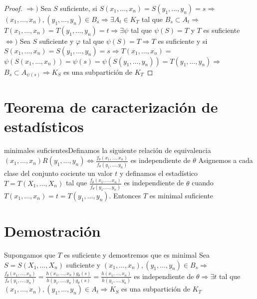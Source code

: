   \begin{proof}
    $\Rightarrow)$ Sea $S$ suficiente, si $S\left(x_{1}, \ldots, x_{n}\right)=S\left(y_{1}, \ldots, y_{n}\right)=s \Rightarrow$ $\left(x_{1}, \ldots, x_{n}\right),\left(y_{1}, \ldots, y_{n}\right) \in B_{s} \Rightarrow \exists A_{t} \in K_{T}$ tal que $B_{s} \subset A_{t} \Rightarrow$ $T\left(x_{1}, \ldots, x_{n}\right)=T\left(y_{1}, \ldots, y_{n}\right)=t \Rightarrow \exists \psi$ tal que $\psi(S)=T$ y $T$ es suficiente\\
    $\Leftrightarrow)$ Sea $S$ suficiente y $\varphi$ tal que $\psi(S)=T \Rightarrow T$ es suficiente y si $S\left(x_{1}, \ldots, x_{n}\right)=S\left(y_{1}, \ldots, y_{n}\right)=s \Rightarrow T\left(x_{1}, \ldots, x_{n}\right)=$ $\psi\left(S\left(x_{1}, \ldots, x_{n}\right)\right)=\psi(s)=\psi\left(S\left(y_{1}, \ldots, y_{n}\right)\right)=T\left(y_{1}, \ldots, y_{n}\right) \Rightarrow$ $B_{s} \subset A_{\psi(s)} \Rightarrow K_{S}$ es una subpartición de $K_{T}$
  \end{proof}
  
  \section*{Teorema de caracterización de estadísticos}
  minimales suficientesDefinamos la siguiente relación de equivalencia $\left(x_{1}, \ldots, x_{n}\right) R\left(y_{1}, \ldots, y_{n}\right) \Leftrightarrow \frac{f_{\theta}\left(x_{1}, \ldots, x_{n}\right)}{f_{\theta}\left(y_{1}, \ldots, y_{n}\right)}$ es independiente de $\theta$ Asignemos a cada clase del conjunto cociente un valor $t$ y definamos el estadístico $T=T\left(X_{1}, \ldots, X_{n}\right)$ tal que $\frac{f_{\theta}\left(x_{1}, \ldots, x_{n}\right)}{f_{\theta}\left(y_{1}, \ldots, y_{n}\right)}$ es independiente de $\theta$ cuando $T\left(x_{1}, \ldots, x_{n}\right)=t=T\left(y_{1}, \ldots, y_{n}\right)$. Entonces $T$ es minimal suficiente
  
  \section*{Demostración}
  Supongamos que $T$ es suficiente y demostremos que es minimal Sea $S=S\left(X_{1}, \ldots, X_{n}\right)$ suficiente y $\left(x_{1}, \ldots, x_{n}\right),\left(y_{1}, \ldots, y_{n}\right) \in B_{s} \Rightarrow$ $\frac{f_{\theta}\left(x_{1}, \ldots, x_{n}\right)}{f_{\theta}\left(y_{1}, \ldots, y_{n}\right)}=\frac{h\left(x_{1}, \ldots, x_{n}\right) g_{\theta}(s)}{h\left(y_{1}, \ldots, y_{n}\right) g_{\theta}(s)}=\frac{h\left(x_{1}, \ldots, x_{n}\right)}{h\left(y_{1}, \ldots, y_{n}\right)}$ es independiente de $\theta \Rightarrow \exists t$ tal que $\left(x_{1}, \ldots, x_{n}\right),\left(y_{1}, \ldots, y_{n}\right) \in A_{t} \Rightarrow K_{S}$ es una subpartición de $K_{T}$
  
